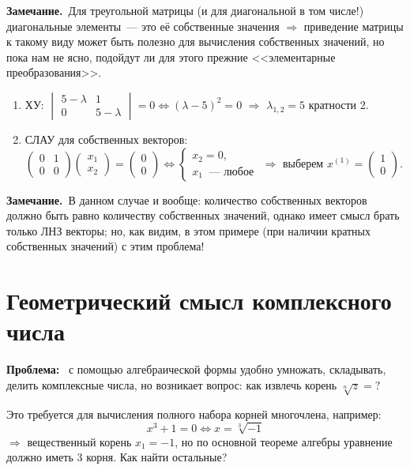 \documentclass[a4paper,11pt]{article}
\newcommand{\lead}[1]{\textbf{\color{leadcol}#1}\ }
\newcommand{\zam}{\textbf{Замечание.}\ }
\begin{document}
\zam Для треугольной матрицы (и для диагональной в том числе!) диагональные элементы~--- это её
собственные значения $\Rightarrow$ приведение матрицы к такому виду может быть полезно для вычисления
собственных значений, но пока нам не ясно, подойдут ли для этого прежние <<элементарные
преобразования>>.
\begin{enumerate}[label=\arabic*.]
\item ХУ: $\begin{vmatrix}5-\lambda&1\\0&5-\lambda\end{vmatrix}=0\iff(\lambda-5)^2=0$ $\Rightarrow$
$\lambda_{1,2}=5$ кратности 2.
\item СЛАУ для собственных векторов:
$\begin{pmatrix}0&1\\0&0\end{pmatrix}\begin{pmatrix}x_1\\x_2\end{pmatrix}=\begin{pmatrix}0\\0\end{pmatrix}
\iff\begin{cases}x_2=0,\\x_1\ \text{~--- любое}\end{cases}$ $\Rightarrow$ выберем
$x^{(1)}=\begin{pmatrix}1\\0\end{pmatrix}$.
\end{enumerate}
\zam В данном случае и вообще: количество собственных векторов должно быть равно количеству
собственных значений, однако имеет смысл брать только ЛНЗ векторы; но, как видим, в этом примере
(при наличии кратных собственных значений) с этим проблема!

\section{Геометрический смысл комплексного числа}
\lead{Проблема:} с помощью алгебраической формы удобно умножать, складывать, делить комплексные
числа, но возникает вопрос: как извлечь корень $\sqrt[n]{z}=?$

Это требуется для вычисления полного набора корней многочлена, например:
\[
x^3+1=0\iff x=\sqrt[3]{-1}
\]
$\Rightarrow$ вещественный корень $x_1=-1$, но по основной теореме алгебры уравнение должно иметь
3 корня. Как найти остальные?
\end{document}
